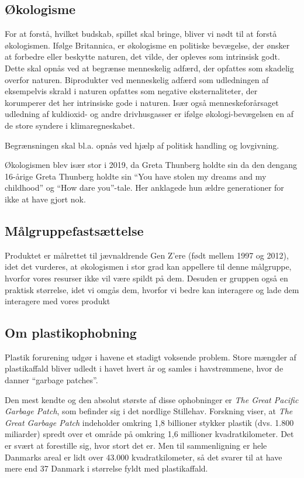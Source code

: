 \subsection{Økologisme}
For at forstå, hvilket budskab, spillet skal bringe, bliver vi nødt til at forstå økologismen. Ifølge Britannica, er økologisme en politiske bevægelse, der ønsker at forbedre eller beskytte naturen, det vilde, der opleves som intrinsisk godt. Dette skal opnås ved at begrænse menneskelig adfærd, der opfattes som skadelig overfor naturen. Biprodukter ved menneskelig adfærd som udledningen af eksempelvis skrald i naturen opfattes som negative eksternaliteter, der korumperer det her intrinsiske gode i naturen. Især også menneskeforårsaget udledning af kuldioxid- og andre drivhusgasser er ifølge økologi-bevægelsen en af de store syndere i klimaregneskabet.

Begrænsningen skal bl.a. opnås ved hjælp af politisk handling og lovgivning.

Økologismen blev især stor i 2019, da Greta Thunberg holdte sin da den dengang 16-årige Greta Thunberg holdte sin ``You have stolen my dreams and my childhood'' og ``How dare you''-tale. Her anklagede hun ældre generationer for ikke at have gjort nok.

\subsection{Målgruppefastsættelse}
Produktet er målrettet til jævnaldrende Gen Z'ere (født mellem 1997 og 2012), idet det vurderes, at økologismen i stor grad kan appellere til denne målgruppe, hvorfor vores resurser ikke vil være spildt på dem. Desuden er gruppen også en praktisk størrelse, idet vi omgås dem, hvorfor vi bedre kan interagere og lade dem interagere med vores produkt

\subsection{Om plastikophobning}
Plastik forurening udgør i havene et stadigt voksende problem. Store mængder af plastikaffald bliver udledt i havet hvert år og samles i havstrømmene, hvor de danner ``garbage patches''. 

Den mest kendte og den absolut største af disse ophobninger er \textit{The Great Pacific Garbage Patch}, som befinder sig i det nordlige Stillehav. Forskning viser, at \textit{The Great Garbage Patch} indeholder omkring 1,8 billioner stykker plastik (dvs. 1.800 miliarder) spredt over et område på omkring 1,6 millioner kvadratkilometer. Det er svært at forestille sig, hvor stort det er. Men til sammenligning er hele Danmarks areal er lidt over 43.000 kvadratkilometer, så det svarer til at have mere end 37 Danmark i størrelse fyldt med plastikaffald.


